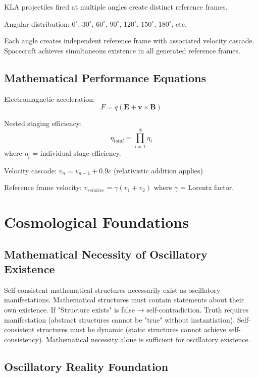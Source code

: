 \documentclass[12pt,a4paper]{article}
\begin{document}
KLA projectiles fired at multiple angles create distinct reference frames.

Angular distribution: $0^\circ$, $30^\circ$, $60^\circ$, $90^\circ$, $120^\circ$, $150^\circ$, $180^\circ$, etc.

Each angle creates independent reference frame with associated velocity cascade. Spacecraft achieves simultaneous existence in all generated reference frames.

\subsection{Mathematical Performance Equations}

Electromagnetic acceleration:
\begin{equation}
F = q(\mathbf{E} + \mathbf{v} \times \mathbf{B})
\end{equation}

Nested staging efficiency:
\begin{equation}
\eta_{total} = \prod_{i=1}^{N} \eta_i
\end{equation}
where $\eta_i$ = individual stage efficiency.

Velocity cascade: $v_n = v_{n-1} + 0.9c$ (relativistic addition applies)

Reference frame velocity: $v_{relative} = \gamma(v_1 + v_2)$ where $\gamma$ = Lorentz factor.

\section{Cosmological Foundations}

\subsection{Mathematical Necessity of Oscillatory Existence}

Self-consistent mathematical structures necessarily exist as oscillatory manifestations. Mathematical structures must contain statements about their own existence. If "Structure exists" is false → self-contradiction. Truth requires manifestation (abstract structures cannot be "true" without instantiation). Self-consistent structures must be dynamic (static structures cannot achieve self-consistency). Mathematical necessity alone is sufficient for oscillatory existence.

\subsection{Oscillatory Reality Foundation}
\end{document}
